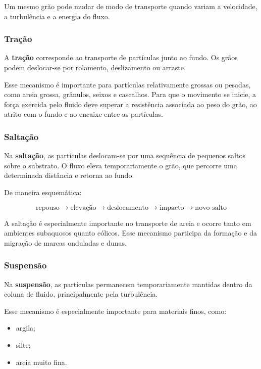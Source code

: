 \documentclass[a4paper,12pt]{article}
\theoremstyle{definition}
\theoremstyle{definition}
\theoremstyle{definition}
\begin{document}
Um mesmo grão pode mudar de modo de transporte quando variam a velocidade, a
turbulência e a energia do fluxo.

\subsubsection{Tração}

A \textbf{tração} corresponde ao transporte de partículas junto ao fundo. Os
grãos podem deslocar-se por rolamento, deslizamento ou arraste.

Esse mecanismo é importante para partículas relativamente grossas ou pesadas,
como areia grossa, grânulos, seixos e cascalhos. Para que o movimento se inicie,
a força exercida pelo fluido deve superar a resistência associada ao peso do
grão, ao atrito com o fundo e ao encaixe entre as partículas.

\subsubsection{Saltação}

Na \textbf{saltação}, as partículas deslocam-se por uma sequência de pequenos
saltos sobre o substrato. O fluxo eleva temporariamente o grão, que percorre uma
determinada distância e retorna ao fundo.

De maneira esquemática:

\[
\text{repouso}
\rightarrow
\text{elevação}
\rightarrow
\text{deslocamento}
\rightarrow
\text{impacto}
\rightarrow
\text{novo salto}
\]

A saltação é especialmente importante no transporte de areia e ocorre tanto em
ambientes subaquosos quanto eólicos. Esse mecanismo participa da formação e da
migração de marcas onduladas e dunas.

\subsubsection{Suspensão}

Na \textbf{suspensão}, as partículas permanecem temporariamente mantidas dentro
da coluna de fluido, principalmente pela turbulência.

Esse mecanismo é especialmente importante para materiais finos, como:

\begin{itemize}
    \item argila;
    \item silte;
    \item areia muito fina.
\end{itemize}
\end{document}
